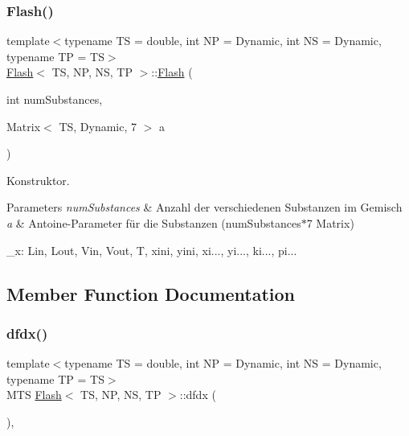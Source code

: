 \subsubsection{\texorpdfstring{Flash()}{Flash()}}
{\footnotesize\ttfamily template$<$typename TS = double, int NP = Dynamic, int NS = Dynamic, typename TP = TS$>$ \\
\mbox{\hyperlink{class_flash}{Flash}}$<$ TS, NP, NS, TP $>$\+::\mbox{\hyperlink{class_flash}{Flash}} (\begin{DoxyParamCaption}\item[{int}]{num\+Substances,  }\item[{Matrix$<$ TS, Dynamic, 7 $>$}]{a }\end{DoxyParamCaption})\hspace{0.3cm}{\ttfamily [inline]}}



Konstruktor. 


\begin{DoxyParams}{Parameters}
{\em num\+Substances} & Anzahl der verschiedenen Substanzen im Gemisch \\
\hline
{\em a} & Antoine-\/\+Parameter für die Substanzen (num\+Substances$\ast$7 Matrix) \\
\hline
\end{DoxyParams}
\+\_\+x\+: Lin, Lout, Vin, Vout, T, xini, yini, xi..., yi..., ki..., pi...

\subsection{Member Function Documentation}
\mbox{\label{class_flash_a83e35b3ab13b3705f0fe06c40b800a8b}} 
\subsubsection{\texorpdfstring{dfdx()}{dfdx()}}
{\footnotesize\ttfamily template$<$typename TS = double, int NP = Dynamic, int NS = Dynamic, typename TP = TS$>$ \\
M\+TS \mbox{\hyperlink{class_flash}{Flash}}$<$ TS, NP, NS, TP $>$\+::dfdx (\begin{DoxyParamCaption}{ }\end{DoxyParamCaption})\hspace{0.3cm}{\ttfamily [inline]}, {\ttfamily [virtual]}}



